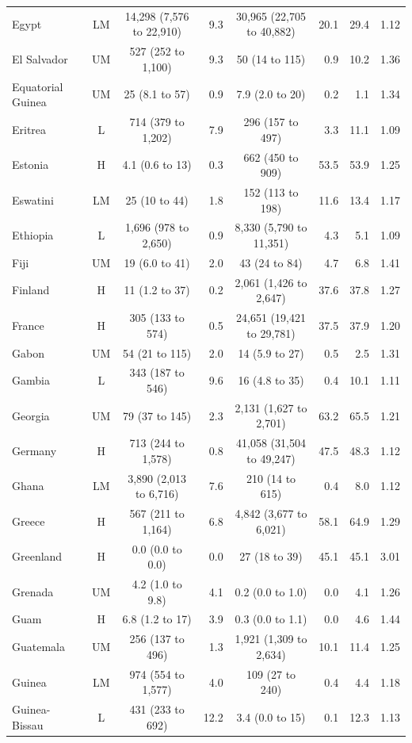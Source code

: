 \begin{longtable}{lccrcrrr}
Egypt & LM & 14,298 (7,576 to 22,910) & 9.3 & 30,965 (22,705 to 40,882) & 20.1 & 29.4 & 1.12 \\
El Salvador & UM & 527 (252 to 1,100) & 9.3 & 50 (14 to 115) & 0.9 & 10.2 & 1.36 \\
Equatorial Guinea & UM & 25 (8.1 to 57) & 0.9 & 7.9 (2.0 to 20) & 0.2 & 1.1 & 1.34 \\
Eritrea & L & 714 (379 to 1,202) & 7.9 & 296 (157 to 497) & 3.3 & 11.1 & 1.09 \\
Estonia & H & 4.1 (0.6 to 13) & 0.3 & 662 (450 to 909) & 53.5 & 53.9 & 1.25 \\
Eswatini & LM & 25 (10 to 44) & 1.8 & 152 (113 to 198) & 11.6 & 13.4 & 1.17 \\
Ethiopia & L & 1,696 (978 to 2,650) & 0.9 & 8,330 (5,790 to 11,351) & 4.3 & 5.1 & 1.09 \\
Fiji & UM & 19 (6.0 to 41) & 2.0 & 43 (24 to 84) & 4.7 & 6.8 & 1.41 \\
Finland & H & 11 (1.2 to 37) & 0.2 & 2,061 (1,426 to 2,647) & 37.6 & 37.8 & 1.27 \\
France & H & 305 (133 to 574) & 0.5 & 24,651 (19,421 to 29,781) & 37.5 & 37.9 & 1.20 \\
Gabon & UM & 54 (21 to 115) & 2.0 & 14 (5.9 to 27) & 0.5 & 2.5 & 1.31 \\
Gambia & L & 343 (187 to 546) & 9.6 & 16 (4.8 to 35) & 0.4 & 10.1 & 1.11 \\
Georgia & UM & 79 (37 to 145) & 2.3 & 2,131 (1,627 to 2,701) & 63.2 & 65.5 & 1.21 \\
Germany & H & 713 (244 to 1,578) & 0.8 & 41,058 (31,504 to 49,247) & 47.5 & 48.3 & 1.12 \\
Ghana & LM & 3,890 (2,013 to 6,716) & 7.6 & 210 (14 to 615) & 0.4 & 8.0 & 1.12 \\
Greece & H & 567 (211 to 1,164) & 6.8 & 4,842 (3,677 to 6,021) & 58.1 & 64.9 & 1.29 \\
Greenland & H & 0.0 (0.0 to 0.0) & 0.0 & 27 (18 to 39) & 45.1 & 45.1 & 3.01 \\
Grenada & UM & 4.2 (1.0 to 9.8) & 4.1 & 0.2 (0.0 to 1.0) & 0.0 & 4.1 & 1.26 \\
Guam & H & 6.8 (1.2 to 17) & 3.9 & 0.3 (0.0 to 1.1) & 0.0 & 4.6 & 1.44 \\
Guatemala & UM & 256 (137 to 496) & 1.3 & 1,921 (1,309 to 2,634) & 10.1 & 11.4 & 1.25 \\
Guinea & LM & 974 (554 to 1,577) & 4.0 & 109 (27 to 240) & 0.4 & 4.4 & 1.18 \\
Guinea-Bissau & L & 431 (233 to 692) & 12.2 & 3.4 (0.0 to 15) & 0.1 & 12.3 & 1.13 \\

\end{longtable}
